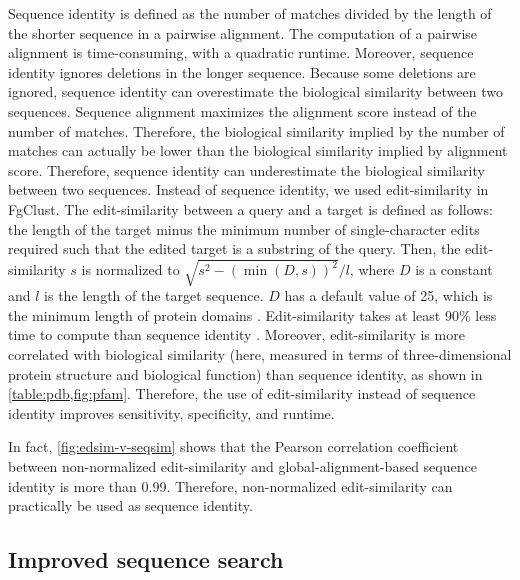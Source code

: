\documentclass{bioinfo}
\begin{document}
Sequence identity is defined as the number of matches divided by the length of the shorter sequence in a pairwise alignment.
The computation of a pairwise alignment is time-consuming, with a quadratic runtime. 
Moreover, sequence identity ignores deletions in the longer sequence.
Because some deletions are ignored, sequence identity can overestimate the biological similarity between two sequences.
Sequence alignment maximizes the alignment score instead of the number of matches.
Therefore, the biological similarity implied by the number of matches can actually be lower than the biological similarity implied by alignment score.
Therefore, sequence identity can underestimate the biological similarity between two sequences.
Instead of sequence identity, we used edit-similarity in FgClust.
The edit-similarity between a query and a target is defined as follows: 
the length of the target minus the minimum number of single-character edits required such that the edited target is a substring of the query.
Then, the edit-similarity \(s\) is normalized to \(\sqrt{ s^2-(\min(D,s))^2}/l\), where \(D\) is a constant and \(l\) is the length of the target sequence.
\(D\) has a default value of 25, which is the minimum length of protein domains \citep[page 8]{niazi2016biosimilars}.
Edit-similarity takes at least 90\% less time to compute than sequence identity \citep{vsovsic2017edlib}.
Moreover, edit-similarity is more correlated with biological similarity (here, measured in terms of three-dimensional protein structure and biological function) than sequence identity, as shown in \cref{table:pdb,fig:pfam}.
Therefore, the use of edit-similarity instead of sequence identity improves sensitivity, specificity, and runtime.

In fact, \cref{fig:edsim-v-seqsim} shows that the Pearson correlation coefficient between non-normalized edit-similarity and global-alignment-based sequence identity is more than \SI{0.99}{}. Therefore, non-normalized edit-similarity can practically be used as sequence identity.

\subsection{Improved sequence search}
\label{subsec:seqsearch}
\end{document}
